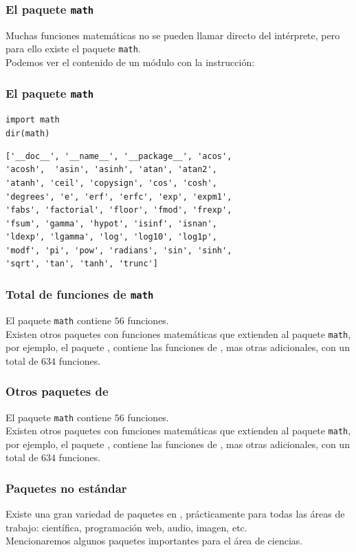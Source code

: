 \begin{frame}[fragile]
\frametitle{El paquete \texttt{math}}
Muchas funciones matemáticas no se pueden llamar directo del intérprete, pero para ello existe el paquete \texttt{math}.
\\
\bigskip
Podemos ver el contenido de un módulo con la instrucción:
\end{frame}
\begin{frame}[fragile]
\frametitle{El paquete \texttt{math}}
\verb|import math| \\
\verb|dir(math)|
\fontsize{10}{10}\selectfont
\begin{verbatim}
['__doc__', '__name__', '__package__', 'acos',
'acosh',  'asin', 'asinh', 'atan', 'atan2',
'atanh', 'ceil', 'copysign', 'cos', 'cosh',
'degrees', 'e', 'erf', 'erfc', 'exp', 'expm1',
'fabs', 'factorial', 'floor', 'fmod', 'frexp',
'fsum', 'gamma', 'hypot', 'isinf', 'isnan',
'ldexp', 'lgamma', 'log', 'log10', 'log1p',
'modf', 'pi', 'pow', 'radians', 'sin', 'sinh',
'sqrt', 'tan', 'tanh', 'trunc']
\end{verbatim}
\end{frame}
\begin{frame}
\frametitle{Total de funciones de \texttt{math}}
El paquete \texttt{math} contiene $56$ funciones.
\\
\bigskip
Existen otros paquetes con funciones matemáticas que extienden al paquete \texttt{math}, por ejemplo, el paquete , contiene las funciones de , mas otras adicionales, con un total de $634$ funciones.
\end{frame}
\begin{frame}
\frametitle{Otros paquetes de \python}
El paquete \texttt{math} contiene $56$ funciones.
\\
\bigskip
Existen otros paquetes con funciones matemáticas que extienden al paquete \texttt{math}, por ejemplo, el paquete , contiene las funciones de , mas otras adicionales, con un total de $634$ funciones.
\end{frame}
\begin{frame}
\frametitle{Paquetes no estándar}
Existe una gran variedad de paquetes en \python, prácticamente para todas las áreas de trabajo: científica, programación web, audio, imagen, etc.
\\
\bigskip
Mencionaremos algunos paquetes importantes para el área de ciencias.
\end{frame}
